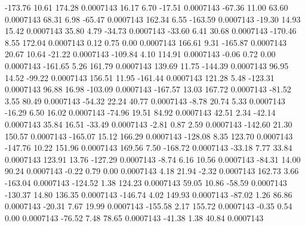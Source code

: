      -173.76       10.61      174.28     0.0007143
       16.17        6.70      -17.51     0.0007143
      -67.36       11.00       63.60     0.0007143
       68.31        6.98      -65.47     0.0007143
      162.34        6.55     -163.59     0.0007143
      -19.30       14.93       15.42     0.0007143
       35.80        4.79      -34.73     0.0007143
      -33.60        6.41       30.68     0.0007143
     -170.46        8.55      172.04     0.0007143
        0.12        0.75        0.00     0.0007143
      166.61        9.31     -165.87     0.0007143
       20.67       10.64      -21.22     0.0007143
     -109.84        4.10      114.91     0.0007143
       -0.06        0.72        0.00     0.0007143
     -161.65        5.26      161.79     0.0007143
      139.69       11.75     -144.39     0.0007143
       96.95       14.52      -99.22     0.0007143
      156.51       11.95     -161.44     0.0007143
      121.28        5.48     -123.31     0.0007143
       96.88       16.98     -103.09     0.0007143
     -167.57       13.03      167.72     0.0007143
      -81.52        3.55       80.49     0.0007143
      -54.32       22.24       40.77     0.0007143
       -8.78       20.74        5.33     0.0007143
      -16.29        6.50       16.02     0.0007143
      -74.96       19.51       84.92     0.0007143
       42.51        2.34      -42.14     0.0007143
       35.84       16.51      -33.49     0.0007143
       -2.81        0.87        2.59     0.0007143
     -142.60       21.30      150.57     0.0007143
     -165.07       15.12      166.29     0.0007143
     -128.08        8.35      123.70     0.0007143
     -147.76       10.22      151.96     0.0007143
      169.56        7.50     -168.72     0.0007143
      -33.18        7.77       33.84     0.0007143
      123.91       13.76     -127.29     0.0007143
       -8.74        6.16       10.56     0.0007143
      -84.31       14.00       90.24     0.0007143
       -0.22        0.79        0.00     0.0007143
        4.18       21.94       -2.32     0.0007143
      162.73        3.66     -163.04     0.0007143
     -124.52        1.38      124.23     0.0007143
       59.05       10.86      -58.59     0.0007143
     -130.37       14.80      136.35     0.0007143
     -146.74        4.02      149.93     0.0007143
      -87.02        1.26       86.86     0.0007143
      -20.31        7.67       19.99     0.0007143
     -155.58        2.17      155.72     0.0007143
       -0.35        0.54        0.00     0.0007143
      -76.52        7.48       78.65     0.0007143
      -41.38        1.38       40.84     0.0007143
